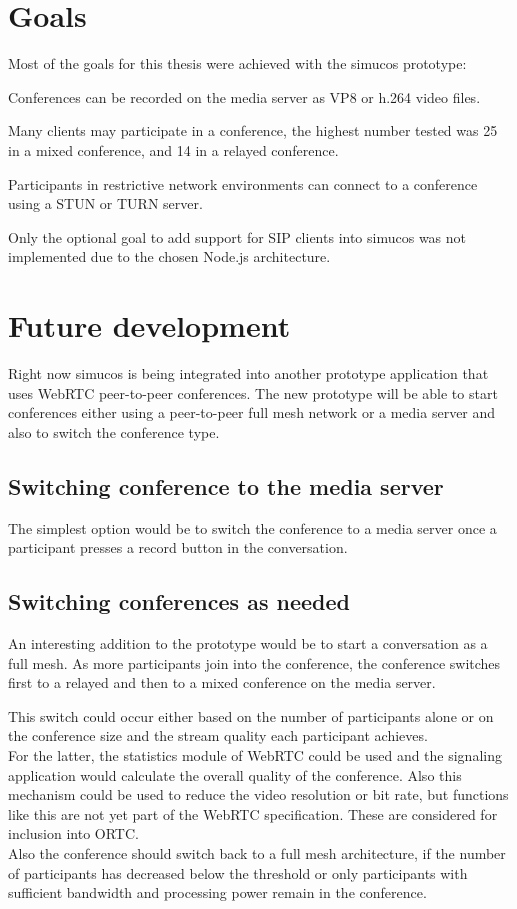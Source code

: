 \documentclass[../../../thesis.tex]{subfiles}
\begin{document}
\section{Goals}
Most of the goals for this thesis were achieved with the simucos prototype:\par
Conferences can be recorded on the media server as VP8 or h.264 video files.\par
Many clients may participate in a conference, the highest number tested was 25 in a mixed conference, and 14 in a relayed conference.\par
Participants in restrictive network environments can connect to a conference using a STUN or TURN server.\par
Only the optional goal to add support for SIP clients into simucos was not implemented due to the chosen Node.js architecture.

\section{Future development}
Right now simucos is being integrated into another prototype application that uses WebRTC peer-to-peer conferences. The new prototype will be able to start conferences either using a peer-to-peer full mesh network or a media server and also to switch the conference type.

\subsection{Switching conference to the media server}
The simplest option would be to switch the conference to a media server once a participant presses a record button in the conversation.

\subsection{Switching conferences as needed}
An interesting addition to the prototype would be to start a conversation as a full mesh. As more participants join into the conference, the conference switches first to a relayed and then to a mixed conference on the media server.\par
This switch could occur either based on the number of participants alone or on the conference size and the stream quality each participant achieves.\\

For the latter, the statistics module of WebRTC could be used and the signaling application would calculate the overall quality of the conference. Also this mechanism could be used to reduce the video resolution or bit rate, but functions like this are not yet part of the WebRTC specification\cite{webrtc-1.0}. These are considered for inclusion into ORTC\cite{ortc-api}.\\

Also the conference should switch back to a full mesh architecture, if the number of participants has decreased below the threshold or only participants with sufficient bandwidth and processing power remain in the conference.\\
\end{document}
